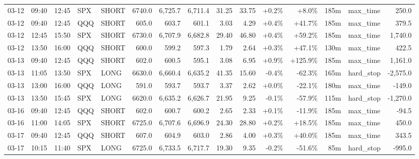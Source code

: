 \documentclass[11pt,a4paper,twoside]{article}
\begin{document}
\begin{landscape}
\begin{center}
\begin{longtable}{>{\color{txtmain}}l l l l l r r r r r r r r >{\color{txtmain}}l r}
03-12 & 09:40 & 12:45 & SPX & SHORT & 6740.0 & 6,725.7 & 6,711.4 & 31.25 & 33.75 & \textcolor{wingreen}{+0.2\%} & \textcolor{wingreen}{+8.0\%} & 185m & max\_time & \textcolor{wingreen}{250.0} \\
03-12 & 09:40 & 12:45 & QQQ & SHORT & 605.0 & 603.7 & 601.1 & 3.03 & 4.29 & \textcolor{wingreen}{+0.4\%} & \textcolor{wingreen}{+41.7\%} & 185m & max\_time & \textcolor{wingreen}{379.5} \\
03-12 & 12:45 & 15:50 & SPX & SHORT & 6730.0 & 6,707.9 & 6,682.8 & 29.40 & 46.80 & \textcolor{wingreen}{+0.4\%} & \textcolor{wingreen}{+59.2\%} & 185m & max\_time & \textcolor{wingreen}{1,740.0} \\
03-12 & 13:50 & 16:00 & QQQ & SHORT & 600.0 & 599.2 & 597.3 & 1.79 & 2.64 & \textcolor{wingreen}{+0.3\%} & \textcolor{wingreen}{+47.1\%} & 130m & max\_time & \textcolor{wingreen}{422.5} \\
03-13 & 09:40 & 12:45 & QQQ & SHORT & 602.0 & 600.5 & 595.1 & 3.08 & 6.95 & \textcolor{wingreen}{+0.9\%} & \textcolor{wingreen}{+125.9\%} & 185m & max\_time & \textcolor{wingreen}{1,161.0} \\
03-13 & 11:05 & 13:50 & SPX & LONG & 6630.0 & 6,660.4 & 6,635.2 & 41.35 & 15.60 & \textcolor{lossred}{-0.4\%} & \textcolor{lossred}{-62.3\%} & 165m & hard\_stop & \textcolor{lossred}{-2,575.0} \\
03-13 & 13:00 & 16:00 & QQQ & LONG & 591.0 & 593.7 & 593.7 & 3.37 & 2.62 & \textcolor{wingreen}{+0.0\%} & \textcolor{lossred}{-22.1\%} & 180m & max\_time & \textcolor{lossred}{-149.0} \\
03-13 & 13:50 & 15:45 & SPX & LONG & 6620.0 & 6,635.2 & 6,626.7 & 21.95 & 9.25 & \textcolor{lossred}{-0.1\%} & \textcolor{lossred}{-57.9\%} & 115m & hard\_stop & \textcolor{lossred}{-1,270.0} \\
03-16 & 09:40 & 12:45 & QQQ & SHORT & 602.0 & 600.7 & 600.2 & 2.65 & 2.33 & \textcolor{wingreen}{+0.1\%} & \textcolor{lossred}{-11.9\%} & 185m & max\_time & \textcolor{lossred}{-94.5} \\
03-16 & 11:00 & 14:05 & SPX & SHORT & 6725.0 & 6,707.6 & 6,696.9 & 24.30 & 28.80 & \textcolor{wingreen}{+0.2\%} & \textcolor{wingreen}{+18.5\%} & 185m & max\_time & \textcolor{wingreen}{450.0} \\
03-17 & 09:40 & 12:45 & QQQ & SHORT & 607.0 & 604.9 & 603.0 & 2.86 & 4.00 & \textcolor{wingreen}{+0.3\%} & \textcolor{wingreen}{+40.0\%} & 185m & max\_time & \textcolor{wingreen}{343.5} \\
03-17 & 10:15 & 11:40 & SPX & LONG & 6725.0 & 6,733.5 & 6,717.7 & 19.30 & 9.35 & \textcolor{lossred}{-0.2\%} & \textcolor{lossred}{-51.6\%} & 85m & hard\_stop & \textcolor{lossred}{-995.0} \\

\end{longtable}
\end{center}
\end{landscape}
\end{document}
